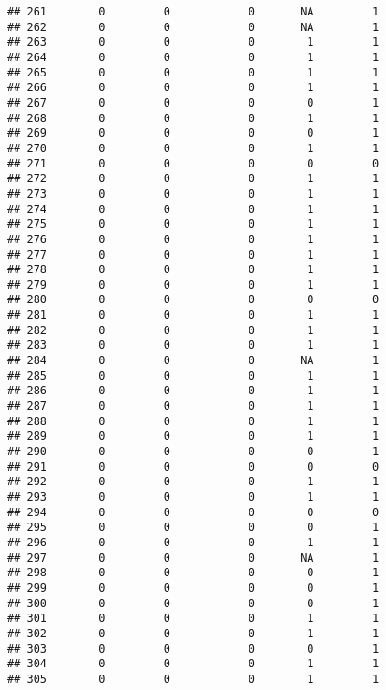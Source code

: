 \documentclass[
]{article}
\begin{document}
\begin{verbatim}
## 261        0         0            0       NA         1
## 262        0         0            0       NA         1
## 263        0         0            0        1         1
## 264        0         0            0        1         1
## 265        0         0            0        1         1
## 266        0         0            0        1         1
## 267        0         0            0        0         1
## 268        0         0            0        1         1
## 269        0         0            0        0         1
## 270        0         0            0        1         1
## 271        0         0            0        0         0
## 272        0         0            0        1         1
## 273        0         0            0        1         1
## 274        0         0            0        1         1
## 275        0         0            0        1         1
## 276        0         0            0        1         1
## 277        0         0            0        1         1
## 278        0         0            0        1         1
## 279        0         0            0        1         1
## 280        0         0            0        0         0
## 281        0         0            0        1         1
## 282        0         0            0        1         1
## 283        0         0            0        1         1
## 284        0         0            0       NA         1
## 285        0         0            0        1         1
## 286        0         0            0        1         1
## 287        0         0            0        1         1
## 288        0         0            0        1         1
## 289        0         0            0        1         1
## 290        0         0            0        0         1
## 291        0         0            0        0         0
## 292        0         0            0        1         1
## 293        0         0            0        1         1
## 294        0         0            0        0         0
## 295        0         0            0        0         1
## 296        0         0            0        1         1
## 297        0         0            0       NA         1
## 298        0         0            0        0         1
## 299        0         0            0        0         1
## 300        0         0            0        0         1
## 301        0         0            0        1         1
## 302        0         0            0        1         1
## 303        0         0            0        0         1
## 304        0         0            0        1         1
## 305        0         0            0        1         1

\end{verbatim}
\end{document}
